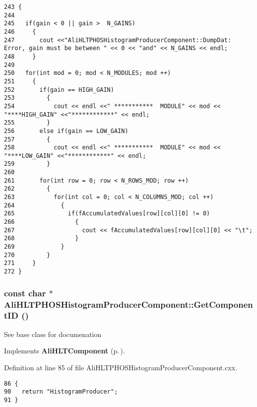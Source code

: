 \footnotesize\begin{verbatim}243 {
244 
245   if(gain < 0 || gain >  N_GAINS)
246     {
247       cout <<"AliHLTPHOSHistogramProducerComponent::DumpDat: Error, gain must be between " << 0 << "and" << N_GAINS << endl;
248     }
249   
250   for(int mod = 0; mod < N_MODULES; mod ++)
251     {
252       if(gain == HIGH_GAIN)
253         {
254           cout << endl <<" ***********  MODULE" << mod << "****HIGH_GAIN" <<"************" << endl;
255         }
256       else if(gain == LOW_GAIN)
257         {
258           cout << endl <<" ***********  MODULE" << mod << "****LOW_GAIN" <<"************" << endl;
259         }
260       
261       for(int row = 0; row < N_ROWS_MOD; row ++)
262         {
263           for(int col = 0; col < N_COLUMNS_MOD; col ++)
264             {
265               if(fAccumulatedValues[row][col][0] != 0)
266                 { 
267                   cout << fAccumulatedValues[row][col][0] << "\t";
268                 }
269             }
270         } 
271     }
272 }
\end{verbatim}\normalsize 


\subsubsection{\setlength{\rightskip}{0pt plus 5cm}const char $\ast$ Ali\-HLTPHOSHistogram\-Producer\-Component::Get\-Component\-ID ()\hspace{0.3cm}{\tt  [virtual]}}\label{classAliHLTPHOSHistogramProducerComponent_a10}


See base class for documenation 

Implements {\bf Ali\-HLTComponent} {\rm (p.\,\pageref{classAliHLTComponent_a9})}.

Definition at line 85 of file Ali\-HLTPHOSHistogram\-Producer\-Component.cxx.

\footnotesize\begin{verbatim}86 {
90   return "HistogramProducer";
91 }
\end{verbatim}\normalsize 



